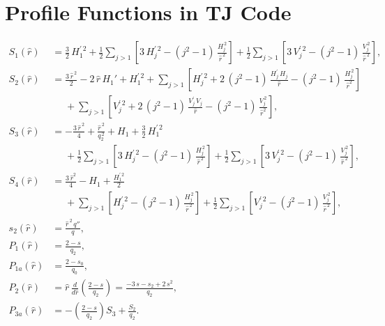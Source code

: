 \documentclass[12pt,prb,aps]{revtex4-1}
\begin{document}
\section{Profile Functions in TJ Code}
\begin{align}
S_1(\hat{r}) &= \frac{3}{2}\,H_1^{\prime\,2}+ \frac{1}{2}\sum_{j>1}\left[3\,H_j^{\prime\,2}-(j^2-1)\,\frac{H_j^{\,2}}{\hat{r}^{\,2}}\right]
+ \frac{1}{2}\sum_{j>1}\left[3\,V_j^{\prime\,2}-(j^2-1)\,\frac{V_j^{\,2}}{\hat{r}^{\,2}}\right],\\[0.5ex]
S_2(\hat{r})&= \frac{3\,\hat{r}^{\,2}}{2}-2\,\hat{r}\,H_1'+ H_1^{\prime\,2} + \sum_{j>1}\left[H_j^{\prime\,2} + 2\,(j^2-1)\,\frac{H_j^{\prime}\,H_j}{\hat{r}}
-(j^2-1)\,\frac{H_j^{\,2}}{\hat{r}^2}\right]\nonumber\\[0.5ex]
&\phantom{=} + \sum_{j>1}\left[V_j^{\prime\,2} + 2\,(j^2-1)\,\frac{V_j^{\prime}\,V_j}{\hat{r}}
-(j^2-1)\,\frac{V_j^{\,2}}{\hat{r}^2}\right],\\[0.5ex]
S_3(\hat{r})&= -\frac{3\,\hat{r}^{\,2}}{4} + \frac{\hat{r}^{\,2}}{q_2^{\,2}} +H_1+\frac{3}{2}\,H_1^{\prime\,2}\nonumber\\[0.5ex]
&\phantom{=}+ \frac{1}{2}\sum_{j>1}\left[3\,H_j^{\prime\,2}-(j^2-1)\,\frac{H_j^{\,2}}{\hat{r}^{\,2}}\right]
+ \frac{1}{2}\sum_{j>1}\left[3\,V_j^{\prime\,2}-(j^2-1)\,\frac{V_j^{\,2}}{\hat{r}^{\,2}}\right],\\[0.5ex]
S_4(\hat{r})&= \frac{3\,\hat{r}^2}{4} -H_1+\frac{H_1^{\prime\,2}}{2}\nonumber\\[0.5ex]
&\phantom{=}+ \sum_{j>1}\left[H_j^{\prime\,2}-(j^2-1)\,\frac{H_j^{\,2}}{\hat{r}^{\,2}}\right]
+ \frac{1}{2}\sum_{j>1}\left[V_j^{\prime\,2}-(j^2-1)\,\frac{V_j^{\,2}}{\hat{r}^{\,2}}\right],\\[0.5ex]
s_2(\hat{r}) &= \frac{\hat{r}^{\,2}\,q''}{q},\\[0.5ex]
P_1(\hat{r}) &= \frac{2-s}{q_2},\\[0.5ex]
P_{1a}(\hat{r}) &= \frac{2-s_0}{q_0},\\[0.5ex]
P_2(\hat{r})&= \hat{r}\,\frac{d}{d\hat{r}}\!\left(\frac{2-s}{q_2}\right)= \frac{-3\,s-s_2+2\,s^2}{q_2},\\[0.5ex]
P_{3a}(\hat{r}) &= - \left(\frac{2-s}{q_2}\right)S_3 + \frac{S_2}{q_2}.
\end{align}
\end{document}
